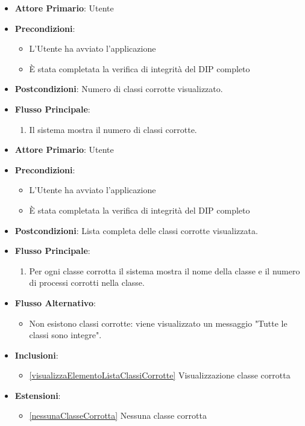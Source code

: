 \begin{itemize}
    \item \textbf{Attore Primario}: Utente
    \item \textbf{Precondizioni}: 
        \begin{itemize}
            \item L'Utente ha avviato l'applicazione
            \item È stata completata la verifica di integrità del DIP completo
        \end{itemize} 
    \item \textbf{Postcondizioni}: Numero di classi corrotte visualizzato.     
    \item \textbf{Flusso Principale}:
        \begin{enumerate}
            \item Il sistema mostra il numero di classi corrotte.
        \end{enumerate}
\end{itemize}

\begin{itemize}
    \item \textbf{Attore Primario}: Utente
    \item \textbf{Precondizioni}: 
        \begin{itemize}
            \item L'Utente ha avviato l'applicazione
            \item È stata completata la verifica di integrità del DIP completo
        \end{itemize}
    \item \textbf{Postcondizioni}: Lista completa delle classi corrotte visualizzata.     
    \item \textbf{Flusso Principale}:
        \begin{enumerate}
            \item Per ogni classe corrotta il sistema mostra il nome della classe e il numero di processi corrotti nella classe.
        \end{enumerate}
    \item \textbf{Flusso Alternativo}:
        \begin{itemize}
            \item Non esistono classi corrotte: viene visualizzato un messaggio "Tutte le classi sono integre".
        \end{itemize}
    \item \textbf{Inclusioni}: \begin{itemize}
        \item \ref{visualizzaElementoListaClassiCorrotte} Visualizzazione classe corrotta
    \end{itemize}
    \item \textbf{Estensioni}: \begin{itemize}
        \item \ref{nessunaClasseCorrotta} Nessuna classe corrotta
    \end{itemize}
\end{itemize}

